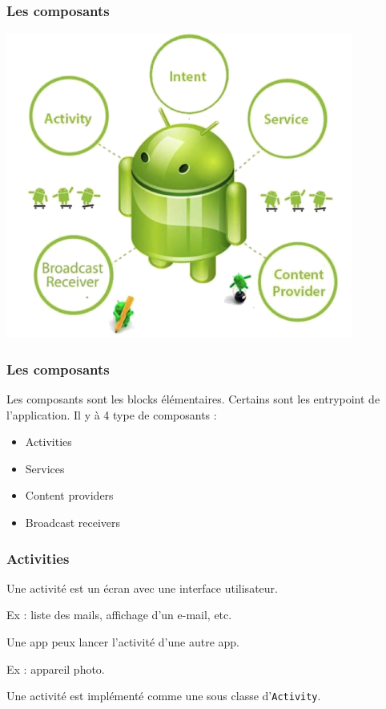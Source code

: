 \documentclass{beamer}
\begin{document}
\begin{frame}
\frametitle{Les composants}

\begin{center}
\includegraphics[scale=0.5]{components.png}
\end{center}
\end{frame}

\begin{frame}
\frametitle{Les composants}

\begin{block}{}
 Les composants sont les blocks élémentaires. Certains sont les entrypoint de l'application. Il y à 4 type de composants :
\end{block}

\begin{itemize}
	\item Activities
	\item Services
	\item Content providers
	\item Broadcast receivers
\end{itemize}

\end{frame}

\begin{frame}
\frametitle{Activities}
\begin{block}{}
Une activité est un écran avec une interface utilisateur.

Ex : liste des mails, affichage d'un e-mail, etc.
\end{block}
\begin{block}{}
Une app peux lancer l'activité d'une autre app.

Ex : appareil photo.
\end{block}

\begin{block}{}
Une activité est implémenté comme une sous classe d'\verb!Activity!.
\end{block}
\end{frame}
\end{document}
